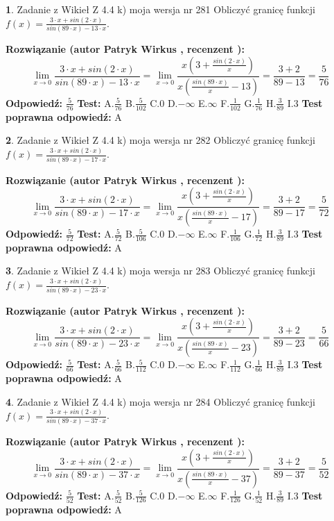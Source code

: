 \documentclass[12pt, a4paper]{article}
\theoremstyle{definition} %
\newtheorem{zad}{}
\newcommand{\zadStart}[1]{\begin{zad}#1\newline}
\newcommand{\zadStop}{\end{zad}}
\newcommand{\rozwStart}[2]{\noindent \textbf{Rozwiązanie (autor #1 , recenzent #2): }\newline}
\newcommand{\rozwStop}{\newline}
\newcommand{\odpStart}{\noindent \textbf{Odpowiedź:}\newline}
\newcommand{\odpStop}{\newline}
\newcommand{\testStart}{\noindent \textbf{Test:}\newline}
\newcommand{\testStop}{\newline}
\newcommand{\kluczStart}{\noindent \textbf{Test poprawna odpowiedź:}\newline}
\newcommand{\kluczStop}{\newline}
\begin{document}
\zadStart{Zadanie z Wikieł Z 4.4 k) moja wersja nr 281}
Obliczyć granicę funkcji $f(x)=\frac{3\cdot x +sin(2\cdot x)}{sin(89\cdot x) -13\cdot x}$.
\zadStop
\rozwStart{Patryk Wirkus}{}
$$\lim\limits_{x\to 0}\frac{3\cdot x +sin(2\cdot x)}{sin(89\cdot x) -13\cdot x}
=\lim\limits_{x\to 0}\frac{x(3+\frac{sin(2\cdot x)}{x})}{x(\frac{sin(89\cdot x)}{x}-13)}
=\frac{3+2}{89-13} = \frac{5}{76}$$
\rozwStop
\odpStart
$\frac{5}{76}$
\odpStop
\testStart
A.$\frac{5}{76}$
B.$\frac{5}{102}$
C.$0$
D.$-\infty$
E.$\infty$
F.$\frac{1}{102}$
G.$\frac{1}{76}$
H.$\frac{3}{89}$
I.$3$
\testStop
\kluczStart
A
\kluczStop



\zadStart{Zadanie z Wikieł Z 4.4 k) moja wersja nr 282}
Obliczyć granicę funkcji $f(x)=\frac{3\cdot x +sin(2\cdot x)}{sin(89\cdot x) -17\cdot x}$.
\zadStop
\rozwStart{Patryk Wirkus}{}
$$\lim\limits_{x\to 0}\frac{3\cdot x +sin(2\cdot x)}{sin(89\cdot x) -17\cdot x}
=\lim\limits_{x\to 0}\frac{x(3+\frac{sin(2\cdot x)}{x})}{x(\frac{sin(89\cdot x)}{x}-17)}
=\frac{3+2}{89-17} = \frac{5}{72}$$
\rozwStop
\odpStart
$\frac{5}{72}$
\odpStop
\testStart
A.$\frac{5}{72}$
B.$\frac{5}{106}$
C.$0$
D.$-\infty$
E.$\infty$
F.$\frac{1}{106}$
G.$\frac{1}{72}$
H.$\frac{3}{89}$
I.$3$
\testStop
\kluczStart
A
\kluczStop



\zadStart{Zadanie z Wikieł Z 4.4 k) moja wersja nr 283}
Obliczyć granicę funkcji $f(x)=\frac{3\cdot x +sin(2\cdot x)}{sin(89\cdot x) -23\cdot x}$.
\zadStop
\rozwStart{Patryk Wirkus}{}
$$\lim\limits_{x\to 0}\frac{3\cdot x +sin(2\cdot x)}{sin(89\cdot x) -23\cdot x}
=\lim\limits_{x\to 0}\frac{x(3+\frac{sin(2\cdot x)}{x})}{x(\frac{sin(89\cdot x)}{x}-23)}
=\frac{3+2}{89-23} = \frac{5}{66}$$
\rozwStop
\odpStart
$\frac{5}{66}$
\odpStop
\testStart
A.$\frac{5}{66}$
B.$\frac{5}{112}$
C.$0$
D.$-\infty$
E.$\infty$
F.$\frac{1}{112}$
G.$\frac{1}{66}$
H.$\frac{3}{89}$
I.$3$
\testStop
\kluczStart
A
\kluczStop



\zadStart{Zadanie z Wikieł Z 4.4 k) moja wersja nr 284}
Obliczyć granicę funkcji $f(x)=\frac{3\cdot x +sin(2\cdot x)}{sin(89\cdot x) -37\cdot x}$.
\zadStop
\rozwStart{Patryk Wirkus}{}
$$\lim\limits_{x\to 0}\frac{3\cdot x +sin(2\cdot x)}{sin(89\cdot x) -37\cdot x}
=\lim\limits_{x\to 0}\frac{x(3+\frac{sin(2\cdot x)}{x})}{x(\frac{sin(89\cdot x)}{x}-37)}
=\frac{3+2}{89-37} = \frac{5}{52}$$
\rozwStop
\odpStart
$\frac{5}{52}$
\odpStop
\testStart
A.$\frac{5}{52}$
B.$\frac{5}{126}$
C.$0$
D.$-\infty$
E.$\infty$
F.$\frac{1}{126}$
G.$\frac{1}{52}$
H.$\frac{3}{89}$
I.$3$
\testStop
\kluczStart
A
\kluczStop
\end{document}

